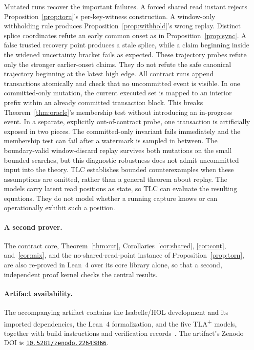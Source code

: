 \documentclass[sigconf,nonacm,10pt]{acmart}
\theoremstyle{plain}
\theoremstyle{definition}
\begin{document}
Mutated runs recover the important failures. A forced shared read
instant rejects Proposition~\ref{prop:torn}'s per-key-witness
construction. A
window-only withholding rule produces Proposition~\ref{prop:withhold}'s
wrong replay. Distinct splice coordinates refute an early common onset
as in Proposition~\ref{prop:sync}. A false trusted recovery point
produces a stale splice, while a claim beginning inside the widened
uncertainty bracket fails as expected. These trajectory probes refute
only the stronger earlier-onset claims. They do not refute the safe
canonical trajectory beginning at the latest high edge. All contract
runs append transactions atomically and check that no uncommitted event
is visible. In one committed-only mutation, the current executed set is
mapped to an interior prefix within an already
committed transaction block. This breaks Theorem~\ref{thm:oracle}'s
membership test without introducing an in-progress event. In a separate,
explicitly out-of-contract probe, one transaction is artificially exposed
in two pieces. The committed-only invariant fails immediately and the
membership test can fail after a watermark is sampled in between. The
boundary-valid window-discard replay survives both mutations on the small
bounded searches, but this diagnostic robustness does not admit
uncommitted input into the theory. TLC establishes bounded counterexamples 
when these assumptions are omitted, rather than a general theorem about replay. The models
carry latent read positions as state, so TLC can evaluate the resulting
equations. They do not model whether a running capture knows or can
operationally exhibit such a position.

\paragraph{A second prover.}
The contract core, Theorem~\ref{thm:cut},
Corollaries~\ref{cor:shared}, \ref{cor:cont}, and~\ref{cor:mix},
and the no-shared-read-point instance of Proposition~\ref{prop:torn},
are also re-proved in Lean~4 over its core library alone, so that a
second, independent proof kernel checks the central results.

\paragraph{Artifact availability.}
The accompanying artifact contains the Isabelle/HOL development and its
imported dependencies, the Lean~4 formalization, and the five
TLA\textsuperscript{+} models, together with build instructions and
verification records~\cite{framework_artifact}.
The artifact's Zenodo DOI is
\href{https://doi.org/10.5281/zenodo.22643866}{\nolinkurl{10.5281/zenodo.22643866}}.
\end{document}
